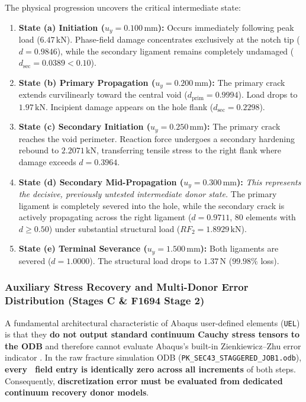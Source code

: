 The physical progression uncovers the critical intermediate state:
\begin{enumerate}
  \item \textbf{State (a) Initiation ($u_y = 0.100\,\mathrm{mm}$):} Occurs immediately following peak load ($6.47\,\mathrm{kN}$). Phase-field damage concentrates exclusively at the notch tip ($d = 0.9846$), while the secondary ligament remains completely undamaged ($d_{\mathrm{sec}} = 0.0389 < 0.10$).
  \item \textbf{State (b) Primary Propagation ($u_y = 0.200\,\mathrm{mm}$):} The primary crack extends curvilinearly toward the central void ($d_{\mathrm{prim}} = 0.9994$). Load drops to $1.97\,\mathrm{kN}$. Incipient damage appears on the hole flank ($d_{\mathrm{sec}} = 0.2298$).
  \item \textbf{State (c) Secondary Initiation ($u_y = 0.250\,\mathrm{mm}$):} The primary crack reaches the void perimeter. Reaction force undergoes a secondary hardening rebound to $2.2071\,\mathrm{kN}$, transferring tensile stress to the right flank where damage exceeds $d = 0.3964$.
  \item \textbf{State (d) Secondary Mid-Propagation ($u_y = 0.300\,\mathrm{mm}$):} \emph{This represents the decisive, previously untested intermediate donor state.} The primary ligament is completely severed into the hole, while the secondary crack is actively propagating across the right ligament ($d = 0.9711$, $80$ elements with $d \ge 0.50$) under substantial structural load ($RF_2 = 1.8929\,\mathrm{kN}$).
  \item \textbf{State (e) Terminal Severance ($u_y = 1.500\,\mathrm{mm}$):} Both ligaments are severed ($d = 1.0000$). The structural load drops to $1.37\,\mathrm{N}$ ($99.98\%$ loss).
\end{enumerate}

\subsubsection{Auxiliary Stress Recovery and Multi-Donor Error Distribution (Stages C \& F1694 Stage 2)}
A fundamental architectural characteristic of Abaqus user-defined elements (\texttt{UEL}) is that they \textbf{do not output standard continuum Cauchy stress tensors to the ODB} and therefore cannot evaluate Abaqus's built-in Zienkiewicz--Zhu error indicator \MISESERI. In the raw fracture simulation ODB (\texttt{PK\_SEC43\_STAGGERED\_JOB1.odb}), \textbf{every \MISESERI\ field entry is identically zero across all increments} of both steps. Consequently, \textbf{discretization error must be evaluated from dedicated continuum recovery donor models}.

